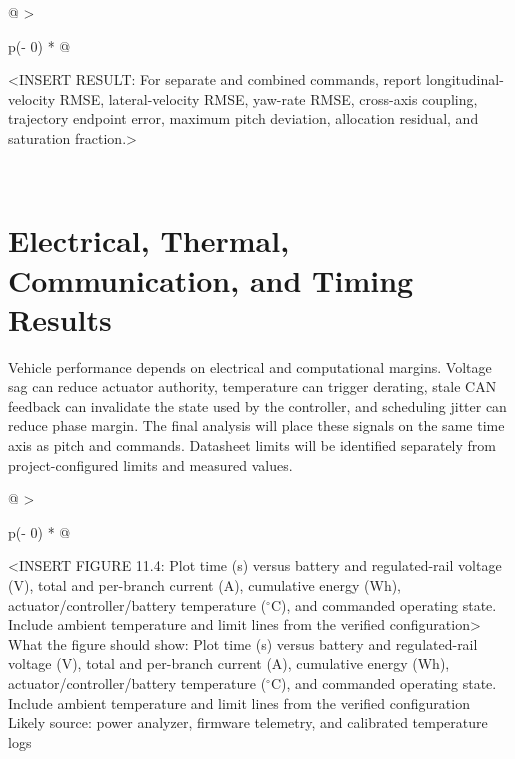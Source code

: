 \begin{longtable}[]{@{}
  >{\raggedright\arraybackslash}p{(\columnwidth - 0\tabcolsep) * }@{}}
\toprule\noalign{}
\begin{minipage}[b]{\linewidth}\raggedright
\textless INSERT RESULT: For separate and combined commands, report
longitudinal-velocity RMSE, lateral-velocity RMSE, yaw-rate RMSE,
cross-axis coupling, trajectory endpoint error, maximum pitch deviation,
allocation residual, and saturation fraction.\textgreater{}
\end{minipage} \\
\midrule\noalign{}
\endhead
\bottomrule\noalign{}
\endlastfoot
\end{longtable}

\section{Electrical, Thermal, Communication, and Timing Results}\label{electrical-thermal-communication-and-timing-results}

Vehicle performance depends on electrical and computational margins.
Voltage sag can reduce actuator authority, temperature can trigger
derating, stale CAN feedback can invalidate the state used by the
controller, and scheduling jitter can reduce phase margin. The final
analysis will place these signals on the same time axis as pitch and
commands. Datasheet limits will be identified separately from
project-configured limits and measured values.

\begin{longtable}[]{@{}
  >{\raggedright\arraybackslash}p{(\columnwidth - 0\tabcolsep) * }@{}}
\toprule\noalign{}
\begin{minipage}[b]{\linewidth}\raggedright
\textless INSERT FIGURE 11.4: Plot time (s) versus battery and
regulated-rail voltage (V), total and per-branch current (A), cumulative
energy (Wh), actuator\slash{}controller\slash{}battery temperature (\ensuremath{^{\circ}}C), and commanded
operating state. Include ambient temperature and limit lines from the
verified configuration\textgreater{}\\
What the figure should show: Plot time (s) versus battery and
regulated-rail voltage (V), total and per-branch current (A), cumulative
energy (Wh), actuator\slash{}controller\slash{}battery temperature (\ensuremath{^{\circ}}C), and commanded
operating state. Include ambient temperature and limit lines from the
verified configuration\\
Likely source: power analyzer, firmware telemetry, and calibrated
temperature logs\strut
\end{minipage} \\
\midrule\noalign{}
\endhead
\bottomrule\noalign{}
\endlastfoot
\end{longtable}

